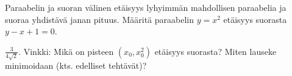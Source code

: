 \begin{tehtavasivu}
\begin{tehtava}
Paraabelin ja suoran välinen etäisyys lyhyimmän mahdollisen paraabelia ja suoraa yhdistävä janan pituus. Määritä paraabelin $y = x^2$ etäisyys suorasta $y-x+1 = 0$.
\begin{vastaus}
	$\frac{3}{4\sqrt{2}}$. Vinkki: Mikä on pisteen $(x_0, x_0^2)$ etäisyys suorasta? Miten lauseke 
minimoidaan (kts. edelliset tehtävät)?
\end{vastaus}
\end{tehtava}



\end{tehtavasivu}
